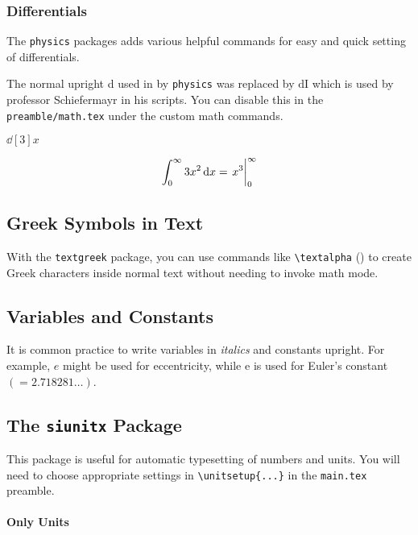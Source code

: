     \subsubsection{Differentials}

    The \texttt{physics} packages adds various helpful commands for easy and quick setting of differentials.

    The normal upright d used in by \texttt{physics} was replaced by $\mathrm{d\!I}$ which is used by professor Schiefermayr in his scripts. You can disable this in the \texttt{preamble/math.tex} under the custom math commands.

     $\dd[3]{x}$

    \[ \int_{0}^{\infty} 3x^2 \dd{x} = \eval{x^3}_{0}^{\infty} \]

\subsection{Greek Symbols in Text}

    With the \verb|textgreek| package, you can use commands like \verb|\textalpha| (\textalpha) to create Greek characters inside normal text without needing to invoke math mode.

\subsection{Variables and Constants}

    It is common practice to write variables in \textit{italics} and constants upright. For example, $e$ might be used for eccentricity, while $\mathrm{e}$ is used for Euler's constant $(=\num{2.718281}\dots)$.


\subsection{The \texttt{siunitx} Package}

    This package is useful for automatic typesetting of numbers and units. You will need to choose appropriate settings in \verb|\unitsetup{...}| in the \verb|main.tex| preamble. %

    \paragraph*{Only Units}

